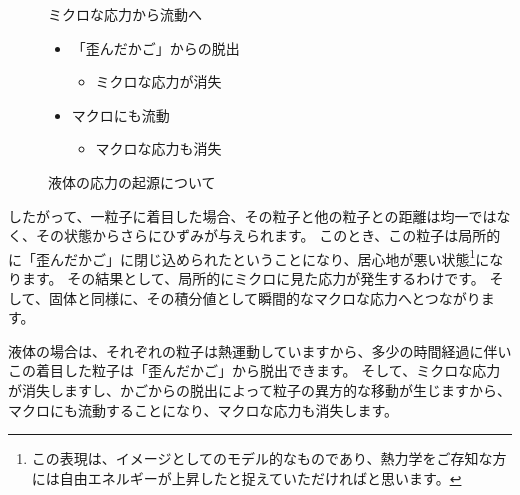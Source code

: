 \documentclass[uplatex,dvipdfmx,a4paper,11pt]{jsarticle}
\begin{document}
\begin{figure}[htb]
\begin{center}
\begin{minipage}{0.45\textwidth}
\begin{itembox}[l]{ミクロな応力から流動へ}
\begin{itemize}
\begin{itemize}
						\item \textcolor{red}{粒子の居心地が悪化}
						\item \textcolor{red}{局所的な応力が発現}
						\item 積分値としてマクロな応力
					\end{itemize}
					\item 「歪んだかご」からの脱出
					\begin{itemize}
						\item ミクロな応力が消失
					\end{itemize}
					\item マクロにも流動
					\begin{itemize}
						\item マクロな応力も消失
					\end{itemize}
				\end{itemize}
			\end{itembox}
		\end{minipage}
		\caption{液体の応力の起源について}
		\label{fig:stress_liquid}
	\end{center}
\end{figure}

したがって、一粒子に着目した場合、その粒子と他の粒子との距離は均一ではなく、その状態からさらにひずみが与えられます。
このとき、この粒子は局所的に「歪んだかご」に閉じ込められたということになり、居心地が悪い状態\footnote{
	この表現は、イメージとしてのモデル的なものであり、熱力学をご存知な方には自由エネルギーが上昇したと捉えていただければと思います。
}になります。
その結果として、局所的にミクロに見た応力が発生するわけです。
そして、固体と同様に、その積分値として瞬間的なマクロな応力へとつながります。

液体の場合は、それぞれの粒子は熱運動していますから、多少の時間経過に伴いこの着目した粒子は「歪んだかご」から脱出できます。
そして、ミクロな応力が消失しますし、かごからの脱出によって粒子の異方的な移動が生じますから、マクロにも流動することになり、マクロな応力も消失します。
\end{document}
